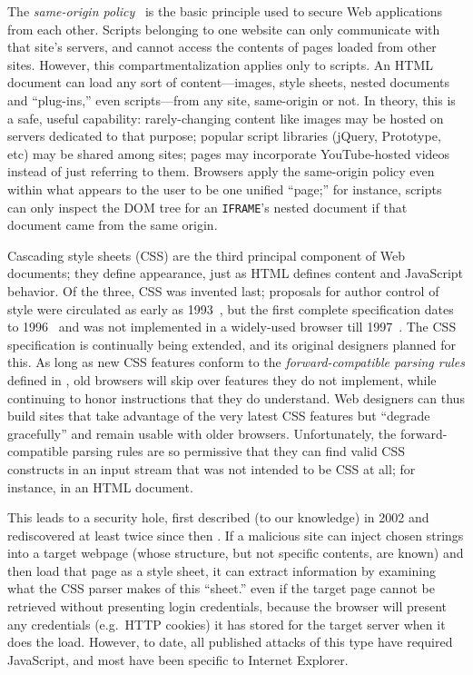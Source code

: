 \documentclass{acm_proc_article-sp}
\begin{document}
The \emph{same-origin policy}~\cite{mozillasameorigin} is the basic
principle used to secure Web applications from each other.  Scripts
belonging to one website can only communicate with that site's
servers, and cannot access the contents of pages loaded from other
sites.  However, this compartmentalization applies only to scripts.
An HTML document can load any sort of content---images, style sheets,
nested documents and “plug-ins,” even scripts---from any site,
same-origin or not.  In theory, this is a safe, useful capability:
rarely-changing content like images may be hosted on servers dedicated
to that purpose; popular script libraries (jQuery, Prototype, etc) may
be shared among sites; pages may incorporate YouTube-hosted videos
instead of just referring to them.  Browsers apply the same-origin
policy even within what appears to the user to be one unified “page;”
for instance, scripts can only inspect the DOM tree for an
\texttt{IFRAME}'s nested document if that document came from the same
origin.

Cascading style sheets (CSS) are the third principal component of Web
documents; they define appearance, just as HTML defines content and
JavaScript behavior.  Of the three, CSS was invented last; proposals
for author control of style were circulated as early as
1993~\cite{css-history}, but the first complete specification dates to
1996~\cite{css1} and was not implemented in a widely-used browser till
1997~\cite{eich}.  The CSS specification is continually being
extended, and its original designers planned for this.  As long as new
CSS features conform to the \emph{forward-compatible parsing rules}
defined in \cite{syndata}, old browsers will skip over features they
do not implement, while continuing to honor instructions that they do
understand.  Web designers can thus build sites that take advantage of
the very latest CSS features but “degrade gracefully” and remain
usable with older browsers.  Unfortunately, the forward-compatible
parsing rules are so permissive that they can find valid CSS
constructs in an input stream that was not intended to be CSS at all;
for instance, in an HTML document.

This leads to a security hole, first described (to our knowledge) in
2002 \cite{cssxss02} and rediscovered at least twice since then
\cite{cssxss05,cssxss08}.  If a malicious site can inject chosen
strings into a target webpage (whose structure, but not specific
contents, are known) and then load that page as a style sheet, it can
extract information by examining what the CSS parser makes of this
“sheet.”  even if the target page cannot be retrieved
without presenting login credentials, because the browser will present
any credentials (e.g.\ HTTP cookies) it has stored for the target
server when it does the load.  However, to date, all published attacks
of this type have required JavaScript, and most have been specific to
Internet Explorer.
\end{document}
